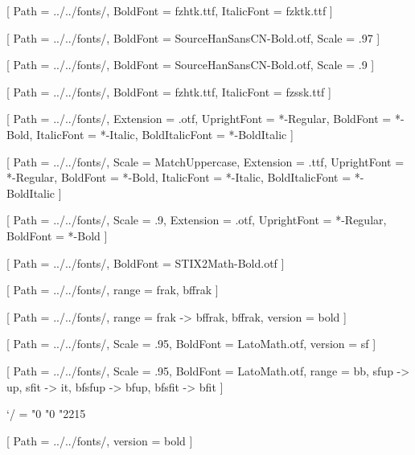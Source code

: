 \usepackage{geometry}
\geometry{
    paperwidth = 155mm,
    paperheight = 235mm,
    outer = 20mm,
    inner = 20mm,
    top = 25mm,
    bottom = 20mm
}

\usepackage[PunctStyle=kaiming]{xeCJK}
\usepackage{amsmath}
\usepackage{unicode-math}

[
    Path = ../../fonts/,
    BoldFont = fzhtk.ttf,
    ItalicFont = fzktk.ttf
]

[
    Path = ../../fonts/,
    BoldFont = SourceHanSansCN-Bold.otf,
    Scale = .97
]

[
    Path = ../../fonts/,
    BoldFont = SourceHanSansCN-Bold.otf,
    Scale = .9
]

[
    Path = ../../fonts/,
    BoldFont = fzhtk.ttf,
    ItalicFont = fzssk.ttf
]

\setmainfont{STIX2Text}[
    Path = ../../fonts/,
    Extension = .otf,
    UprightFont = *-Regular,
    BoldFont = *-Bold,
    ItalicFont = *-Italic,
    BoldItalicFont = *-BoldItalic
]

\setsansfont{Lato}[
    Path = ../../fonts/,
    Scale = MatchUppercase,
    Extension = .ttf,
    UprightFont = *-Regular,
    BoldFont = *-Bold,
    ItalicFont = *-Italic,
    BoldItalicFont = *-BoldItalic
]

\setmonofont{FiraMono}[
    Path = ../../fonts/,
    Scale = .9,
    Extension = .otf,
    UprightFont = *-Regular,
    BoldFont = *-Bold
]

[
    Path = ../../fonts/,
    BoldFont = STIX2Math-Bold.otf
]

[
    Path = ../../fonts/,
    range = {frak, bffrak}
]

[
    Path = ../../fonts/,
    range = {frak -> bffrak, bffrak},
    version = bold
]

[
    Path = ../../fonts/,
    Scale = .95,
    BoldFont = LatoMath.otf,
    version = sf
]

[
    Path = ../../fonts/,
    Scale = .95,
    BoldFont = LatoMath.otf,
    range = {bb, sfup -> up, sfit -> it, bfsfup -> bfup, bfsfit -> bfit}
]


\Umathcode`/  =  "0 "0 "2215    %

\setmathfontface{}[
    Path = ../../fonts/,
    version = bold
]

